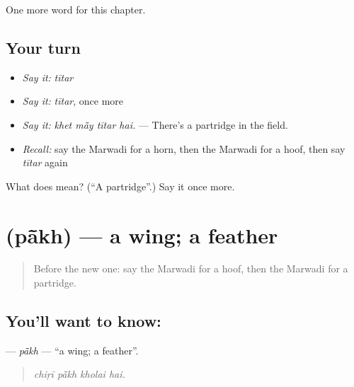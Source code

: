 \begin{grammarlens}[title={What you've built}]
One more word for this chapter.
\end{grammarlens}

\subsection*{Your turn}
\begin{itemize}
\raggedright
  \item \emph{Say it:} \emph{tītar}
  \item \emph{Say it:} \emph{tītar}, once more
  \item \emph{Say it:} \emph{khet mā̃y tītar hai.} — There's a partridge in the field.
  \item \emph{Recall:} say the Marwadi for a horn, then the Marwadi for a hoof, then say \emph{tītar} again
\end{itemize}

\begin{tcolorbox}[breakable,colback=teal!4,colframe=teal!35!black,title={Before you move on}]
What does  mean? (\textquotedblleft{}A partridge\textquotedblright{}.) Say it once more.
\end{tcolorbox}
\section[\texorpdfstring{\mw{पांख} (pā̃kh)}{पांख (pā̃kh)}]{ (pā̃kh) — a wing; a feather}

\label{lesson:MW-C237-pakh}



\begin{quote}
Before the new one: say the Marwadi for a hoof, then the Marwadi for a partridge.
\end{quote}

\subsection*{You'll want to know: }
\textbf{} — \emph{pā̃kh} — \textquotedblleft{}a wing; a feather\textquotedblright{}.

\begin{quote}
   
\end{quote}

\begin{quote}
\emph{chiṛī pā̃kh kholai hai.}
\end{quote}

